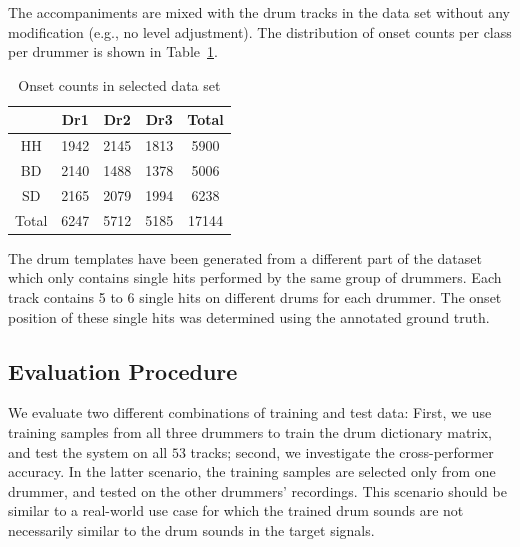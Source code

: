 \documentclass{article}
\newcommand{\tabref}[1]{\mbox{Table~\ref{#1}}}
\newcommand{\figref}[1]{\mbox{Figure~\ref{#1}}}
\begin{document}
The accompaniments are mixed with the drum tracks in the data set without any modification (e.g., no level adjustment). The distribution of onset counts per class per drummer is shown in \tabref{tab:onsetCount}. %

\begin{table}[ht]
\begin{footnotesize}
\centering
\begin{tabular}{|c|c|c|c|c|}
\hline
 & Dr1    & Dr2    & Dr3    & Total \\ \hline
HH        & 1942 & 2145 & 1813 & 5900  \\ \hline
BD        & 2140 & 1488 & 1378 & 5006  \\ \hline
SD        & 2165 & 2079 & 1994 & 6238  \\ \hline
Total     & 6247 & 5712 & 5185 & 17144 \\ \hline
\end{tabular}
 \caption{Onset counts in selected data set}%
 \label{tab:onsetCount}
\end{footnotesize}
\end{table}
The drum templates have been generated from a different part of the dataset which only contains single hits performed by the same group of drummers. Each track contains 5 to 6 single hits on different drums for each drummer. The onset position of these single hits was determined using the annotated ground truth. 

\subsection{Evaluation Procedure}\label{subsec:evaluation procedure}
We evaluate two different combinations of training and test data: First, we use training samples from all three drummers to train the drum dictionary matrix, and test the system on all $53$ tracks; second, we investigate the cross-performer accuracy. %
In the latter scenario, the training samples are selected only from one drummer, and tested on the other drummers' recordings. This scenario should be similar to a real-world use case for which the trained drum sounds are not necessarily similar to the drum sounds in the target signals.

\end{document}
